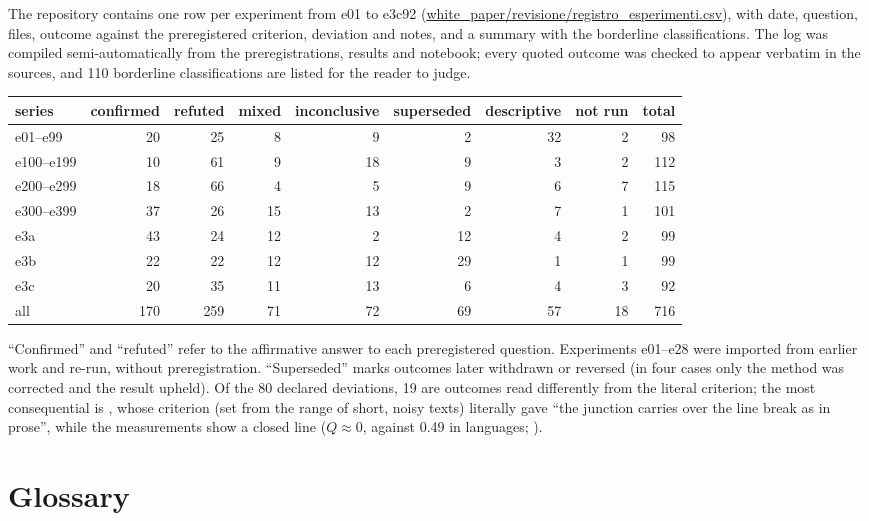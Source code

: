 The repository contains one row per experiment from e01 to e3c92
(\url{white_paper/revisione/registro_esperimenti.csv}), with date, question, files, outcome against the
preregistered criterion, deviation and notes, and a summary with the borderline classifications. The log was compiled
semi-automatically from the preregistrations, results and notebook; every quoted outcome was checked to appear verbatim
in the sources, and 110 borderline classifications are listed for the reader to judge.

\begin{center}\footnotesize
\begin{tabular}{lrrrrrrrr}
\toprule
series & confirmed & refuted & mixed & inconclusive & superseded & descriptive & not run & total \\
\midrule
e01--e99 & 20 & 25 & 8 & 9 & 2 & 32 & 2 & 98 \\
e100--e199 & 10 & 61 & 9 & 18 & 9 & 3 & 2 & 112 \\
e200--e299 & 18 & 66 & 4 & 5 & 9 & 6 & 7 & 115 \\
e300--e399 & 37 & 26 & 15 & 13 & 2 & 7 & 1 & 101 \\
e3a & 43 & 24 & 12 & 2 & 12 & 4 & 2 & 99 \\
e3b & 22 & 22 & 12 & 12 & 29 & 1 & 1 & 99 \\
e3c & 20 & 35 & 11 & 13 & 6 & 4 & 3 & 92 \\
\midrule
all & 170 & 259 & 71 & 72 & 69 & 57 & 18 & 716 \\
\bottomrule
\end{tabular}
\end{center}

\noindent ``Confirmed'' and ``refuted'' refer to the affirmative answer to each preregistered question. Experiments
e01--e28 were imported from earlier work and re-run, without preregistration. ``Superseded'' marks outcomes later
withdrawn or reversed (in four cases only the method was corrected and the result upheld). Of the 80 declared deviations,
19 are outcomes read differently from the literal criterion; the most consequential is , whose criterion
(set from the range of short, noisy texts) literally gave ``the junction carries over the line break as in prose'',
while the measurements show a closed line ($Q \approx 0$, against 0.49 in languages; ).

\section{Glossary}

